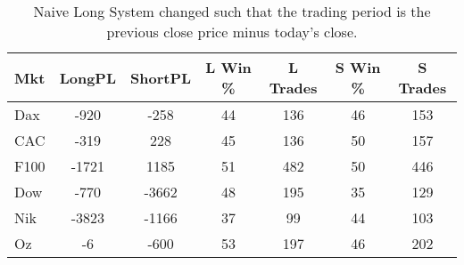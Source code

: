 \begin{table}[ht]
\centering
\caption[Naive Long System - Close to Close]{Naive Long System changed such that the trading period is the previous close price minus today's close.} 
\label{tab:engulf_results}
\begin{tabular}{lcccccc}
  \toprule Mkt & LongPL & ShortPL & L Win \% & L Trades & S Win \% & S Trades \\ 
  \midrule Dax & -920 & -258 & 44 & 136 & 46 & 153 \\ 
  CAC & -319 & 228 & 45 & 136 & 50 & 157 \\ 
  F100 & -1721 & 1185 & 51 & 482 & 50 & 446 \\ 
  Dow & -770 & -3662 & 48 & 195 & 35 & 129 \\ 
  Nik & -3823 & -1166 & 37 & 99 & 44 & 103 \\ 
  Oz & -6 & -600 & 53 & 197 & 46 & 202 \\ 
   \bottomrule \end{tabular}
\end{table}
